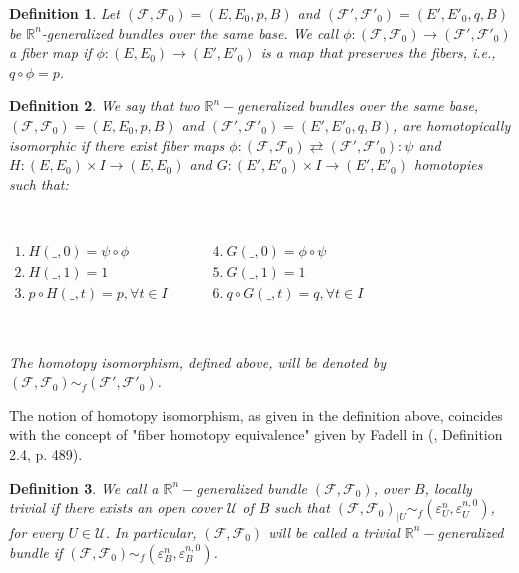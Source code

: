 \documentclass[12pt,oneside]{book}
\newtheorem{defi}   {Definition}[chapter]
\newcommand{\R}{\mathbb{R}}
\begin{document}
    \begin{defi}
        Let $(\mathcal{F},\mathcal{F}_{0})=(E,E_{0},p,B)$ and $(\mathcal{F'},\mathcal{F'}_{0})=(E',E'_{0},q,B)$ be $\R^{n}$-generalized 
        bundles over the same base. We call $\phi:(\mathcal{F},\mathcal{F}_{0})\to (\mathcal{F'},\mathcal{F'}_{0})$ a fiber 
        map if $\phi:(E,E_{0})\to (E',E'_{0})$ is a map that preserves the fibers, i.e., $q\circ\phi=p$.
    \end{defi}

    \begin{defi}\label{defi_iso_homot}
        We say that two $\R^{n}-$generalized bundles over the same base, $(\mathcal{F},\mathcal{F}_{0})=(E,E_{0},p,B)$ and 
        $(\mathcal{F'},\mathcal{F'}_{0})=(E',E'_{0},q,B)$, are homotopically isomorphic if there exist fiber maps 
        $\phi:(\mathcal{F},\mathcal{F}_{0})\rightleftarrows (\mathcal{F'},\mathcal{F'}_{0}):\psi$ and $H:(E,E_{0})\times I\to (E,E_{0})$ and 
        $G:(E',E'_{0})\times I\to (E',E'_{0})$ homotopies such that:
        
        \

        $\begin{array}{lcccl}
            1. \ H(\_,0)=\psi\circ\phi            & & & & 4. \ G(\_,0)=\phi\circ\psi \\
            2. \ H(\_,1)=1                        & & & & 5. \ G(\_,1)=1 \\
            3. \ p\circ H(\_,t)=p, \forall t\in I & & & & 6. \ q\circ G(\_,t)=q, \forall t\in I
        \end{array}$

        \
    
        The homotopy isomorphism, defined above, will be denoted by 
        $(\mathcal{F},\mathcal{F}_{0})\sim_{f} (\mathcal{F'},\mathcal{F'}_{0})$.
    \end{defi}
    
        The notion of homotopy isomorphism, as given in the definition above, coincides with the concept of "fiber homotopy 
        equivalence" given by Fadell in (\cite{fadell_1}, Definition 2.4, p. 489).
    
    \begin{defi}
        We call a $\R^{n}-$generalized bundle $(\mathcal{F},\mathcal{F}_{0})$, over $B$, locally trivial if there 
        exists an open cover $\mathcal{U}$ of $B$ such that 
        $(\mathcal{F},\mathcal{F}_{0})_{|U}\sim_{f} (\varepsilon^{n}_{U},\varepsilon^{n,0}_{U})$, for every $U\in\mathcal{U}$. In particular, 
        $(\mathcal{F},\mathcal{F}_{0})$ will be called a trivial $\R^{n}-$generalized bundle if 
        $(\mathcal{F},\mathcal{F}_{0})\sim_{f} (\varepsilon^{n}_{B},\varepsilon^{n,0}_{B})$.
    \end{defi}
    
\end{document}
